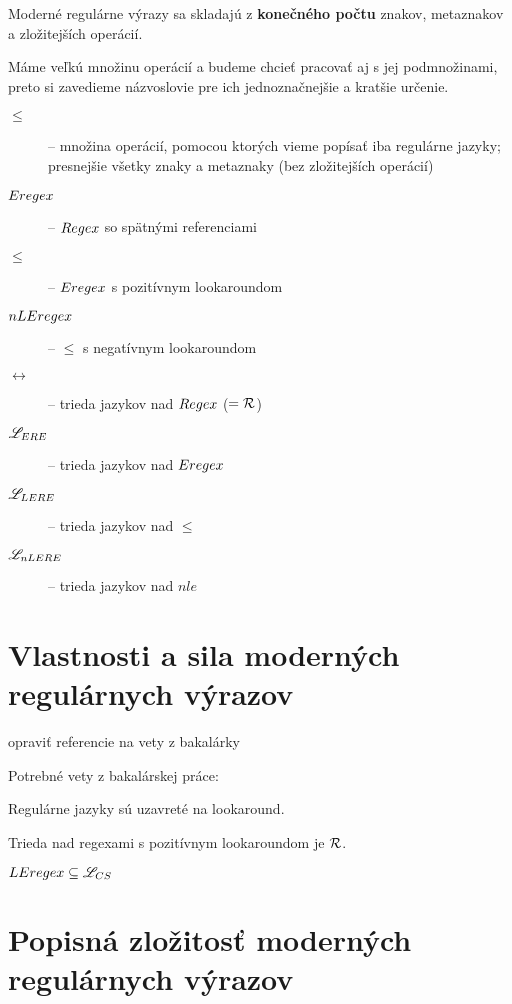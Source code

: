 Moderné regulárne výrazy sa skladajú z \textbf{konečného počtu} znakov, metaznakov a zložitejších operácií.

Máme veľkú množinu operácií a budeme chcieť pracovať aj s jej podmnožinami, preto si zavedieme názvoslovie pre ich jednoznačnejšie a kratšie určenie.

\begin{description}
\item[$\le$] -- množina operácií, pomocou ktorých vieme popísať iba regulárne jazyky; presnejšie všetky znaky a metaznaky (bez zložitejších operácií)
\item[$Eregex$] -- $Regex$ so spätnými referenciami
\item[$\le$] -- $Eregex$ s pozitívnym lookaroundom
\item[$nLEregex$] -- $\le$ s negatívnym lookaroundom
\item[$\rel$] -- trieda jazykov nad $Regex$ ($= {\cal R}$)
\item[$\mathscr{L}_{ERE}$] -- trieda jazykov nad $Eregex$
\item[$\mathscr{L}_{LERE}$] -- trieda jazykov nad $\le$
\item[$\mathscr{L}_{nLERE}$] -- trieda jazykov nad $nle$
\end{description}

\section[Vlastnosti a sila]{Vlastnosti a sila moderných regulárnych výrazov}
\label{usila}

\todo opraviť referencie na vety z bakalárky

Potrebné vety z bakalárskej práce:

\begin{veta}[Veta 2.2.5.]\label{lookahead+R}
Regulárne jazyky sú uzavreté na lookaround.
\end{veta}

\begin{veta}[Veta 2.2.10.]\label{lookaround+R}
Trieda nad regexami s pozitívnym lookaroundom je ${\cal R}$.
\end{veta} 

\begin{veta}[Veta 2.2.14.]\label{le+lcs}
$ LEregex \subseteq \mathscr{L}_{CS} $
\end{veta}

\section[Popisná zložitosť]{Popisná zložitosť moderných regulárnych výrazov}
\label{uzlozitost}

